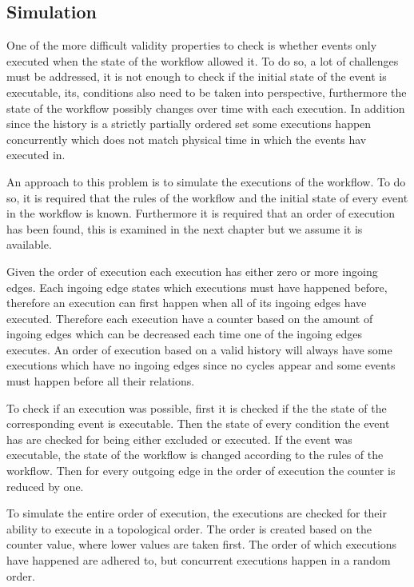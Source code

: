     \subsection{Simulation}\label{sec:historyindcr:simulation}
    One of the more difficult validity properties to check is whether events only executed when the state of the workflow allowed it. To do so, a lot of challenges must be addressed, it is not enough to check if the initial state of the event is executable, its, conditions also need to be taken into perspective, furthermore the state of the workflow possibly changes over time with each execution. In addition since the history is a strictly partially ordered set some executions happen concurrently which does not match physical time in which the events hav executed in.
    
    \newpar An approach to this problem is to simulate the executions of the workflow. To do so, it is required that the rules of the workflow and the initial state of every event in the workflow is known. Furthermore it is required that an order of execution has been found, this is examined in the next chapter but we assume it is available. 
    
    Given the order of execution each execution has either zero or more ingoing edges. Each ingoing edge states which executions must have happened before, therefore an execution can first happen when all of its ingoing edges have executed. Therefore each execution have a counter based on the amount of ingoing edges which can be decreased each time one of the ingoing edges executes. An order of execution based on a valid history will always have some executions which have no ingoing edges since no cycles appear and some events must happen before all their relations. 
    
    \newpar To check if an execution was possible, first it is checked if the the state of the corresponding event is executable. Then the state of every condition the event has are checked for being either excluded or executed. If the event was executable, the state of the workflow is changed according to the rules of the workflow. Then for every outgoing edge in the order of execution the counter is reduced by one. 
    
    \newpar To simulate the entire order of execution, the executions are checked for their ability to execute in a topological order. The order is created based on the counter value, where lower values are taken first. The order of which executions have happened are adhered to, but concurrent executions happen in a random order.
    
